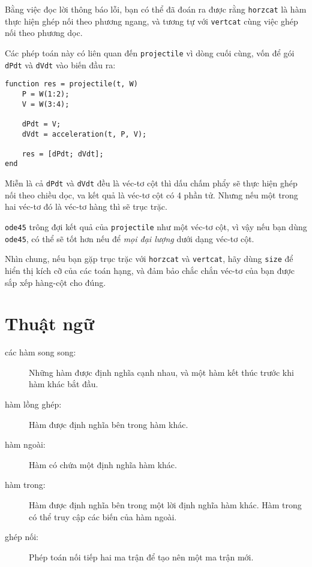 \documentclass[12pt]{book}
\begin{document}
Bằng việc đọc lời thông báo lỗi, bạn có thể đã đoán ra được rằng
{\tt horzcat} là hàm thực hiện ghép nối theo phương ngang, và
tương tự với {\tt vertcat} cùng việc ghép nối theo phương dọc.

Các phép toán này có liên quan đến {\tt projectile} vì dòng cuối
cùng, vốn để gói {\tt dPdt} và {\tt dVdt} vào biến đầu ra:

\begin{verbatim}
function res = projectile(t, W)
    P = W(1:2);
    V = W(3:4);

    dPdt = V;                          
    dVdt = acceleration(t, P, V);

    res = [dPdt; dVdt];
end
\end{verbatim}
%
Miễn là cả {\tt dPdt} và {\tt dVdt} đều là véc-tơ cột thì 
dấu chấm phẩy sẽ thực hiện ghép nối theo chiều dọc, va
kết quả là véc-tơ cột có 4 phần tử. Nhưng nếu một trong
hai véc-tơ đó là véc-tơ hàng thì sẽ trục trặc. 

{\tt ode45} trông đợi kết quả của {\tt projectile} như một
véc-tơ cột, vì vậy nếu bạn dùng {\tt ode45}, có thể sẽ tốt hơn
nếu để {\em mọi đại lượng} dưới dạng véc-tơ cột.

Nhìn chung, nếu bạn gặp trục trặc với {\tt horzcat} và 
{\tt vertcat}, hãy dùng {\tt size} để hiển thị kích cỡ của
các toán hạng, và đảm bảo chắc chắn véc-tơ của bạn được
sắp xếp hàng-cột cho đúng.


\section{Thuật ngữ}

\begin{description}

\item[các hàm song song:] Những hàm được định nghĩa cạnh nhau,
và một hàm kết thúc trước khi hàm khác bắt đầu.

\item[hàm lồng ghép:] Hàm được định nghĩa bên trong hàm khác.

\item[hàm ngoài:] Hàm có chứa một định nghĩa hàm khác.

\item[hàm trong:] Hàm được định nghĩa bên trong một lời định nghĩa
hàm khác. Hàm trong có thể truy cập các biến của hàm ngoài.

\item[ghép nối:] Phép toán nối tiếp hai ma trận để tạo nên một
ma trận mới.


\end{description}
\end{document}
